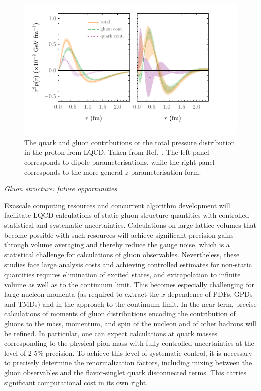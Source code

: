 \begin{figure}
	\centering
	\includegraphics[width=0.7\linewidth]{figures/combinedpressurelattnew.pdf}
	\caption{The quark and gluon contributions ot the total pressure distribution in the proton from LQCD. Taken from Ref.~\cite{Shanahan:2018pib}. The left panel corresponds to dipole parameterisations, while the right panel corresponds to the more general $z$-parameterisation form.}
	\label{gluefig}
\end{figure}

{\it Gluon structure: future opportunities}

Exascale computing resources and concurrent algorithm development will facilitate LQCD calculations of static gluon structure quantities with controlled statistical and systematic uncertainties. Calculations on  large lattice volumes that become possible with such resources  will achieve significant precision gains through volume averaging and thereby reduce the gauge noise, which is a statistical challenge for calculations of gluon observables. Nevertheless, these studies face large analysis costs and achieving controlled estimates for non-static quantities requires elimination of excited states, and extrapolation to infinite volume as well as to the continuum limit. 
This becomes especially challenging for large nucleon momenta (as required to extract the $x$-dependence of PDFs, GPDs and TMDs) and in the approach to the continuum limit. 
%
In the near term, precise calculations of moments of gluon distributions encoding the contribution of gluons to the mass, momentum, and spin of the nucleon and of other hadrons will be refined. In particular, one can expect calculations at quark masses corresponding to the physical pion mass with fully-controlled uncertainties at the level of 2-5\% precision. To achieve this level of systematic control, it is necessary to precisely determine the renormalization factors, including mixing between the gluon observables and the flavor-singlet quark disconnected terms. This carries significant computational cost in its own right.\\
 

